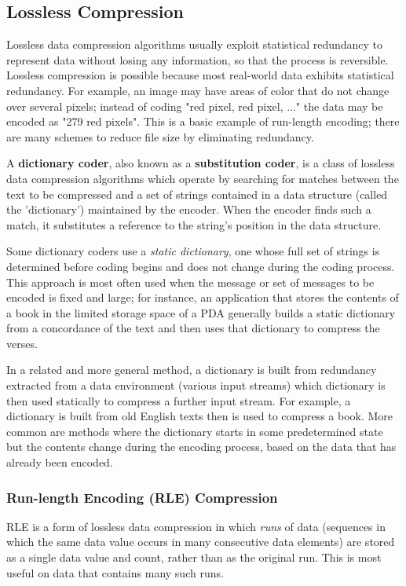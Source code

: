 \documentclass[a4paper, 12pt]{report}
\theoremstyle{remark}
\theoremstyle{definition}
\begin{document}
\subsection{Lossless Compression}
Lossless data compression algorithms usually exploit statistical redundancy to represent data without losing any information, so that the process is reversible. Lossless compression is possible because most real-world data exhibits statistical redundancy. For example, an image may have areas of color that do not change over several pixels; instead of coding "red pixel, red pixel, ..." the data may be encoded as "279 red pixels". This is a basic example of run-length encoding; there are many schemes to reduce file size by eliminating redundancy.

A \textbf{dictionary coder}, also known as a \textbf{substitution coder}, is a class of lossless data compression algorithms which operate by searching for matches between the text to be compressed and a set of strings contained in a data structure (called the 'dictionary') maintained by the encoder. When the encoder finds such a match, it substitutes a reference to the string's position in the data structure. 

Some dictionary coders use a \textit{static dictionary}, one whose full set of strings is determined before coding begins and does not change during the coding process. This approach is most often used when the message or set of messages to be encoded is fixed and large; for instance, an application that stores the contents of a book in the limited storage space of a PDA generally builds a static dictionary from a concordance of the text and then uses that dictionary to compress the verses. 

In a related and more general method, a dictionary is built from redundancy extracted from a data environment (various input streams) which dictionary is then used statically to compress a further input stream. For example, a dictionary is built from old English texts then is used to compress a book. More common are methods where the dictionary starts in some predetermined state but the contents change during the encoding process, based on the data that has already been encoded. 

\subsubsection{Run-length Encoding (RLE) Compression}
RLE is a form of lossless data compression in which \textit{runs} of data (sequences in which the same data value occurs in many consecutive data elements) are stored as a single data value and count, rather than as the original run. This is most useful on data that contains many such runs.
\end{document}
